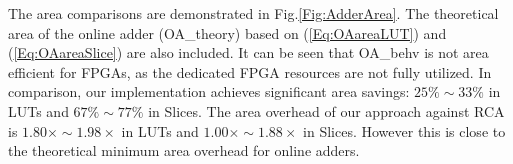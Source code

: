 \documentclass[conference]{IEEEtran}
\begin{document}
The area comparisons are demonstrated in Fig.\ref{Fig:AdderArea}. The theoretical area of the online adder (OA\_theory) based on (\ref{Eq:OAareaLUT}) and (\ref{Eq:OAareaSlice}) are also included. It can be seen that OA\_behv is not area efficient for FPGAs, as the dedicated FPGA resources are not fully utilized. In comparison, our implementation achieves significant area savings: $25\%\sim 33\%$ in LUTs and $67\%\sim77\%$ in Slices. The area overhead of our approach against RCA is $1.80\times\sim1.98\times$ 
in LUTs and $1.00\times\sim1.88\times$ in Slices. However this is close to the theoretical minimum area overhead for online adders.

\begin{figure}[tbp]
  \centering
\end{figure}
\end{document}
